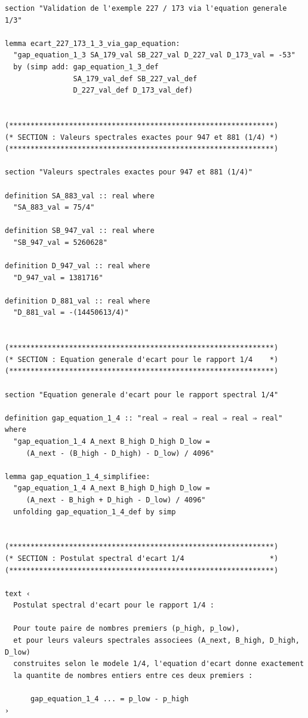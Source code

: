 \documentclass[a4paper,11pt]{article}
\begin{document}
\begin{holcode}[title={\textcolor{white}{Fichier : methode\_spectral.thy -- Partie 1/4}}]
\begin{lstlisting}
section "Validation de l'exemple 227 / 173 via l'equation generale 1/3"

lemma ecart_227_173_1_3_via_gap_equation:
  "gap_equation_1_3 SA_179_val SB_227_val D_227_val D_173_val = -53"
  by (simp add: gap_equation_1_3_def
                SA_179_val_def SB_227_val_def
                D_227_val_def D_173_val_def)


(**************************************************************)
(* SECTION : Valeurs spectrales exactes pour 947 et 881 (1/4) *)
(**************************************************************)

section "Valeurs spectrales exactes pour 947 et 881 (1/4)"

definition SA_883_val :: real where
  "SA_883_val = 75/4"

definition SB_947_val :: real where
  "SB_947_val = 5260628"

definition D_947_val :: real where
  "D_947_val = 1381716"

definition D_881_val :: real where
  "D_881_val = -(14450613/4)"


(**************************************************************)
(* SECTION : Equation generale d'ecart pour le rapport 1/4    *)
(**************************************************************)

section "Equation generale d'ecart pour le rapport spectral 1/4"

definition gap_equation_1_4 :: "real ⇒ real ⇒ real ⇒ real ⇒ real" where
  "gap_equation_1_4 A_next B_high D_high D_low =
     (A_next - (B_high - D_high) - D_low) / 4096"

lemma gap_equation_1_4_simplifiee:
  "gap_equation_1_4 A_next B_high D_high D_low =
     (A_next - B_high + D_high - D_low) / 4096"
  unfolding gap_equation_1_4_def by simp


(**************************************************************)
(* SECTION : Postulat spectral d'ecart 1/4                    *)
(**************************************************************)

text ‹
  Postulat spectral d'ecart pour le rapport 1/4 :

  Pour toute paire de nombres premiers (p_high, p_low),
  et pour leurs valeurs spectrales associees (A_next, B_high, D_high, D_low)
  construites selon le modele 1/4, l'equation d'ecart donne exactement
  la quantite de nombres entiers entre ces deux premiers :

      gap_equation_1_4 ... = p_low - p_high
›


\end{lstlisting}
\end{holcode}
\end{document}
